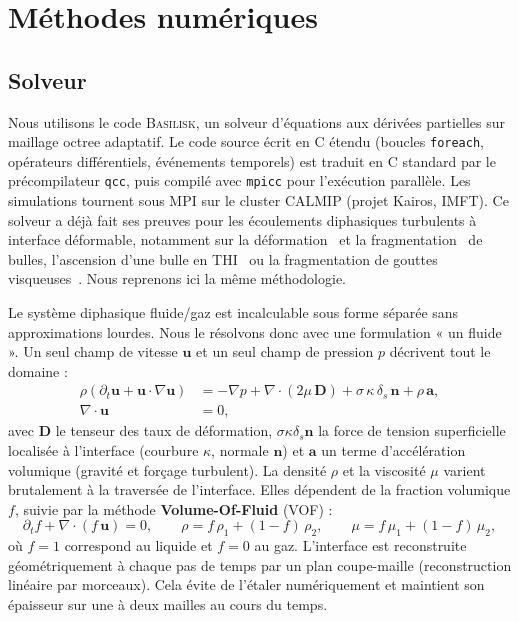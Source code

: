 \section{Méthodes numériques}
\label{sec:methodes}

\subsection{Solveur}
\label{subsec:solveur}

Nous utilisons le code \textsc{Basilisk}, un solveur d'équations aux dérivées partielles sur maillage octree adaptatif. Le code source écrit en C étendu (boucles \texttt{foreach}, opérateurs différentiels, événements temporels) est traduit en C standard par le précompilateur \texttt{qcc}, puis compilé avec \texttt{mpicc} pour l'exécution parallèle. Les simulations tournent sous MPI sur le cluster CALMIP (projet Kairos, IMFT). Ce solveur a déjà fait ses preuves pour les écoulements diphasiques turbulents à interface déformable, notamment sur la déformation~\cite{perrard2021} et la fragmentation~\cite{riviere2021} de bulles, l'ascension d'une bulle en THI~\cite{liu2024} ou la fragmentation de gouttes visqueuses~\cite{farsoiya2023}. Nous reprenons ici la même méthodologie.

Le système diphasique fluide/gaz est incalculable sous forme séparée sans approximations lourdes. Nous le résolvons donc avec une formulation « un fluide ». Un seul champ de vitesse $\mathbf{u}$ et un seul champ de pression $p$ décrivent tout le domaine :
\begin{align}
    \rho\left(\partial_t \mathbf{u} + \mathbf{u}\cdot\nabla\mathbf{u}\right)
        &= -\nabla p + \nabla\cdot\left(2\mu\,\mathbf{D}\right)
           + \sigma\,\kappa\,\delta_s\,\mathbf{n} + \rho\,\mathbf{a}, \\
    \nabla\cdot\mathbf{u} &= 0,
\end{align}
avec $\mathbf{D}$ le tenseur des taux de déformation, $\sigma\kappa\delta_s\mathbf{n}$ la force de tension superficielle localisée à l'interface (courbure $\kappa$, normale $\mathbf{n}$) et $\mathbf{a}$ un terme d'accélération volumique (gravité et forçage turbulent). La densité $\rho$ et la viscosité $\mu$ varient brutalement à la traversée de l'interface. Elles dépendent de la fraction volumique $f$, suivie par la méthode \textbf{Volume-Of-Fluid} (VOF) :
\begin{equation}
    \partial_t f + \nabla\cdot(f\,\mathbf{u}) = 0, \qquad
    \rho = f\,\rho_1 + (1-f)\,\rho_2, \qquad
    \mu = f\,\mu_1 + (1-f)\,\mu_2,
\end{equation}
où $f=1$ correspond au liquide et $f=0$ au gaz. L'interface est reconstruite géométriquement à chaque pas de temps par un plan coupe-maille (reconstruction linéaire par morceaux). Cela évite de l'étaler numériquement et maintient son épaisseur sur une à deux mailles au cours du temps.

